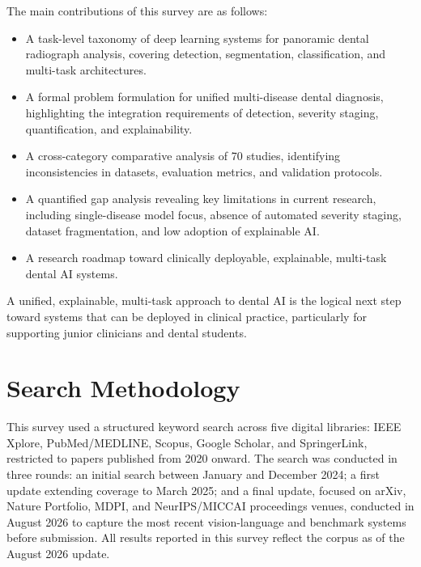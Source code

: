 \documentclass[conference]{IEEEtran}
\begin{document}
The main contributions of this survey are as follows:
\begin{itemize}
    \item A task-level taxonomy of deep learning systems for panoramic
          dental radiograph analysis, covering detection, segmentation,
          classification, and multi-task architectures.
    \item A formal problem formulation for unified multi-disease dental
          diagnosis, highlighting the integration requirements of
          detection, severity staging, quantification, and
          explainability.
    \item A cross-category comparative analysis of 70 studies,
          identifying inconsistencies in datasets, evaluation metrics,
          and validation protocols.
    \item A quantified gap analysis revealing key limitations in current
          research, including single-disease model focus, absence of
          automated severity staging, dataset fragmentation, and low
          adoption of explainable AI.
    \item A research roadmap toward clinically deployable, explainable,
          multi-task dental AI systems.
\end{itemize}

A unified, explainable, multi-task approach to dental AI is the logical
next step toward systems that can be deployed in clinical practice,
particularly for supporting junior clinicians and dental students.




\section{Search Methodology}
\label{sec:methodology}

This survey used a structured keyword search across five digital
libraries: IEEE Xplore, PubMed/MEDLINE, Scopus, Google Scholar, and
SpringerLink, restricted to papers published from 2020 onward. The
search was conducted in three rounds: an initial search between
January and December 2024; a first update extending coverage to March
2025; and a final update, focused on arXiv, Nature Portfolio, MDPI, and
NeurIPS/MICCAI proceedings venues, conducted in August 2026 to capture
the most recent vision-language and benchmark systems before
submission. All results reported in this survey reflect the corpus as
of the August 2026 update.
\end{document}
